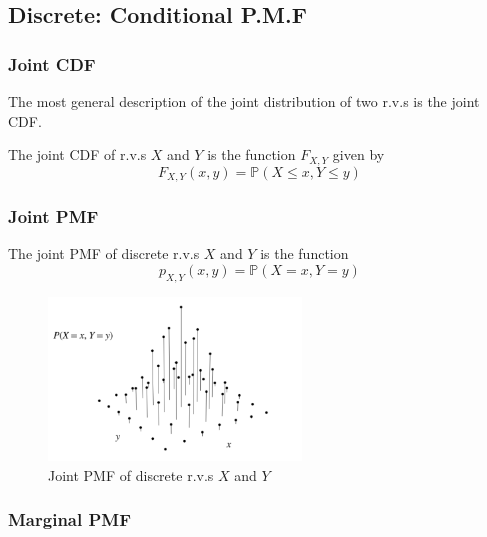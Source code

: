 \documentclass{article}
\begin{document}
\subsection{Discrete: Conditional P.M.F}

\subsubsection{Joint CDF}

The most general description of the joint distribution of two r.v.s is the joint CDF. 

\begin{definition}
    The joint CDF of r.v.s $X$ and $Y$ is the function $F_{X, Y}$ given by \begin{equation}
        F_{X, Y} (x, y) = \mathbb{P}(X\leq x, Y \leq y)
    \end{equation}
\end{definition}

\subsubsection{Joint PMF}

\begin{definition}
    The joint PMF of discrete r.v.s $X$ and $Y$ is the function \begin{equation}
        p_{X, Y} (x,y) = \mathbb{P}(X = x, Y = y)
    \end{equation} 
\end{definition}

\begin{figure}[H]
    \centering
    \includegraphics[width=0.6\textwidth]{Images/discretejointpmf.png}
    \caption{Joint PMF of discrete r.v.s $X$ and $Y$}
    \label{fig:}
\end{figure} 

\subsubsection{Marginal PMF}
\end{document}
